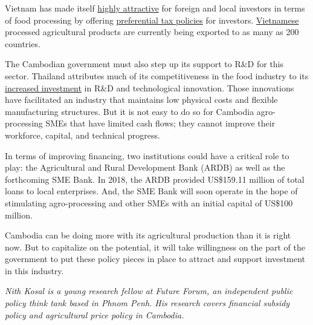 \documentclass[10pt,a4paper]{letter}
\begin{document}
Vietnam has made itself \href{https://www.seavestor.com/vietnams-food-processing-industry-a-promising-option-for-foreign-investors/}{highly attractive} for foreign and local investors in terms of food processing by offering \href{https://www.foodnavigator-asia.com/Article/2019/01/02/Prosperity-project-Vietnam-s-rapidly-growing-food-processing-industry-eyes-foreign-investment?utm_source=copyright&utm_medium=OnSite&utm_campaign=copyright}{preferential tax policies} for investors. \href{http://bizhub.vn/news/foreign-investors-pour-more-money-into-food-processing-and-drinks-industry_302792.html}{Vietnamese} processed agricultural products are currently being exported to as many as 200 countries.

The Cambodian government must also step up its support to R\&D for this sector. Thailand attributes much of its competitiveness in the food industry to its \href{http://www.boi.go.th/upload/content/Food%20industry_5aa7b40bd758b.pdf}{increased investment} in R\&D and technological innovation. Those innovations have facilitated an industry that maintains low physical costs and flexible manufacturing structures. But it is not easy to do so for Cambodia agro-processing SMEs that have limited cash flows; they cannot improve their workforce, capital, and technical progress.

In terms of improving financing, two institutions could have a critical role to play: the Agricultural and Rural Development Bank (ARDB) as well as the forthcoming SME Bank. In 2018, the ARDB provided US\$159.11 million of total loans to local enterprises. And, the SME Bank will soon operate in the hope of stimulating agro-processing and other SMEs with an initial capital of US\$100 million.

Cambodia can be doing more with its agricultural production than it is right now. But to capitalize on the potential, it will take willingness on the part of the government to put these policy pieces in place to attract and support investment in this industry. 

\textit{Nith Kosal is a young research fellow at Future Forum, an independent public policy think tank based in Phnom Penh. His research covers financial subsidy policy and agricultural price policy in Cambodia.
}
\end{document}
